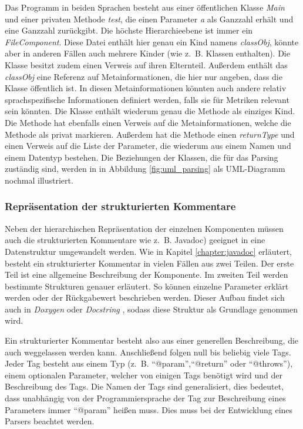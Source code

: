 Das Programm in beiden Sprachen besteht aus einer öffentlichen Klasse \textit{Main} und einer privaten Methode \textit{test}, die einen Parameter \textit{a} als Ganzzahl erhält und eine Ganzzahl zurückgibt. Die höchste Hierarchieebene ist immer ein \textit{FileComponent}. Diese Datei enthält hier genau ein Kind namens \textit{classObj}, könnte aber in anderen Fällen auch mehrere Kinder (wie z.~B. Klassen enthalten). Die Klasse besitzt zudem einen Verweis auf ihren Elternteil. Außerdem enthält das \textit{classObj} eine Referenz auf Metainformationen, die hier nur angeben, dass die Klasse öffentlich ist. In diesen Metainformationen könnten auch andere relativ sprachspezifische Informationen definiert werden, falls sie für Metriken relevant sein könnten. Die Klasse enthält wiederum genau die Methode als einziges Kind. Die Methode hat ebenfalls einen Verweis auf die Metainformationen, welche die Methode als privat markieren. Außerdem hat die Methode einen \textit{returnType} und einen Verweis auf die Liste der Parameter, die wiederum aus einem Namen und einem Datentyp bestehen. Die Beziehungen der Klassen, die für das Parsing zuständig sind, werden in in Abbildung \ref{fig:uml_parsing} als UML-Diagramm nochmal illustriert.

\subsubsection{Repräsentation der strukturierten Kommentare}\label{chapter:structured_comments}
Neben der hierarchischen Repräsentation der einzelnen Komponenten müssen auch die strukturierten Kommentare wie z.~B. Javadoc) geeignet in eine Datenstruktur umgewandelt werden. Wie in Kapitel \ref{chapter:javadoc}
 erläutert, besteht ein strukturierter Kommentar in vielen Fällen aus zwei Teilen. Der erste Teil ist eine allgemeine Beschreibung der Komponente. Im zweiten Teil werden bestimmte Strukturen genauer erläutert. So können einzelne Parameter erklärt werden oder der Rückgabewert beschrieben werden. 
 Dieser Aufbau findet sich auch in \textit{Doxygen} \cite{doxygen} oder \textit{Docstring} \cite{docstring}, sodass diese Struktur als Grundlage genommen wird. 
 
 Ein strukturierter Kommentar besteht also aus einer generellen Beschreibung, die auch weggelassen werden kann. Anschließend folgen null bis beliebig viele Tags. Jeder Tag besteht aus einem Typ (z.~B. \enquote{@param},\enquote{@return} oder \enquote{@throws}), einem optionalen Parameter, welcher von einigen Tags benötigt wird und der Beschreibung des Tags. Die Namen der Tags sind generalisiert, dies bedeutet, dass unabhängig von der Programmiersprache der Tag zur Beschreibung eines Parameters immer \enquote{@param} heißen muss. Dies muss bei der Entwicklung eines Parsers beachtet werden. 
 
